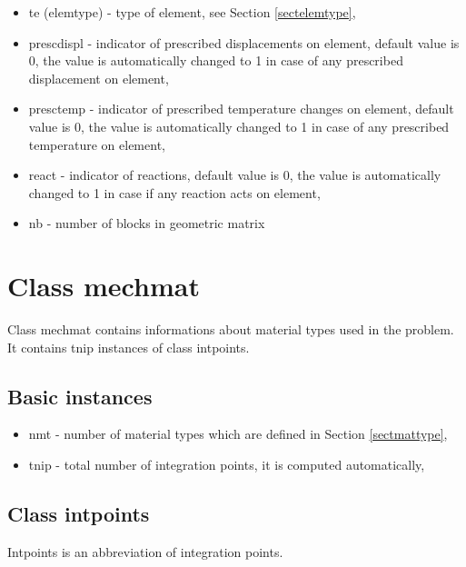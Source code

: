 \begin{itemize}
\item{te (elemtype) - type of element, see Section \ref{sectelemtype},}
\item{prescdispl - indicator of prescribed displacements on element, default value is 0,
the value is automatically changed to 1 in case of any prescribed displacement on element,}
\item{presctemp - indicator of prescribed temperature changes on element, default value is 0,
the value is automatically changed to 1 in case of any prescribed temperature on element,}
\item{react - indicator of reactions, default value is 0, the value is automatically changed to 1 in case if
any reaction acts on element,}
\item{nb - number of blocks in geometric matrix}
\end{itemize}

\chapter{Class {\sf mechmat}}

Class mechmat contains informations about material types used in the problem.
It contains tnip instances of class intpoints.

\section{Basic instances}
\begin{itemize}
\item{nmt - number of material types which are defined in Section \ref{sectmattype},}
\item{tnip - total number of integration points, it is computed automatically,}
\end{itemize}

\section{Class {\sf intpoints}}
Intpoints is an abbreviation of integration points.


